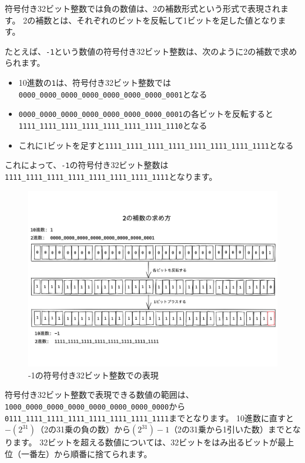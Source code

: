 符号付き32ビット整数では負の数値は、2の補数形式という形式で表現されます。
2の補数とは、それぞれのビットを反転して1ビットを足した値となります。

たとえば、\texttt{-1}という数値の符号付き32ビット整数は、次のように2の補数で求められます。

\begin{itemize}
\item 10進数の\texttt{1}は、符号付き32ビット整数では\texttt{0000\_0000\_0000\_0000\_0000\_0000\_0000\_0001}となる
\item \texttt{0000\_0000\_0000\_0000\_0000\_0000\_0000\_0001}の各ビットを反転すると\texttt{1111\_1111\_1111\_1111\_1111\_1111\_1111\_1110}となる
\item これに1ビットを足すと\texttt{1111\_1111\_1111\_1111\_1111\_1111\_1111\_1111}となる
\end{itemize}

これによって、\texttt{-1}の符号付き32ビット整数は\texttt{1111\_1111\_1111\_1111\_1111\_1111\_1111\_1111}となります。

\begin{figure}[h]
\centering
\includegraphics[width=130mm]{fig/1111.pdf}
\caption{-1の符号付き32ビット整数での表現}
\end{figure}

符号付き32ビット整数で表現できる数値の範囲は、\texttt{1000\_0000\_0000\_0000\_0000\_0000\_0000\_0000}から
\texttt{0111\_1111\_1111\_1111\_1111\_1111\_1111\_1111}までとなります。
10進数に直すと$-(2^{31})$（2の31乗の負の数）から$(2^{31}) - 1$（2の31乗から1引いた数）までとなります。
32ビットを超える数値については、32ビットをはみ出るビットが最上位（一番左）から順番に捨てられます。

